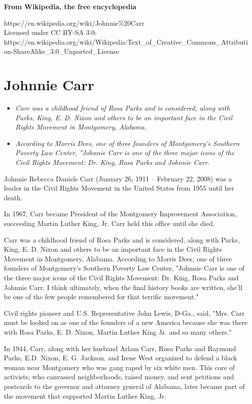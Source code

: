 \textbf{From Wikipedia, the free encyclopedia}

https://en.wikipedia.org/wiki/Johnnie\%20Carr\\
Licensed under CC BY-SA 3.0:\\
https://en.wikipedia.org/wiki/Wikipedia:Text\_of\_Creative\_Commons\_Attribution-ShareAlike\_3.0\_Unported\_License

\section{Johnnie Carr}\label{johnnie-carr}

\begin{itemize}
\item
  \emph{Carr was a childhood friend of Rosa Parks and is considered,
  along with Parks, King, E. D. Nixon and others to be an important face
  in the Civil Rights Movement in Montgomery, Alabama.}
\item
  \emph{According to Morris Dees, one of three founders of Montgomery's
  Southern Poverty Law Center, "Johnnie Carr is one of the three major
  icons of the Civil Rights Movement: Dr. King, Rosa Parks and Johnnie
  Carr.}
\end{itemize}

Johnnie Rebecca Daniels Carr (January 26, 1911 -- February 22, 2008) was
a leader in the Civil Rights Movement in the United States from 1955
until her death.

In 1967, Carr became President of the Montgomery Improvement
Association, succeeding Martin Luther King, Jr. Carr held this office
until she died.

Carr was a childhood friend of Rosa Parks and is considered, along with
Parks, King, E. D. Nixon and others to be an important face in the Civil
Rights Movement in Montgomery, Alabama. According to Morris Dees, one of
three founders of Montgomery's Southern Poverty Law Center, "Johnnie
Carr is one of the three major icons of the Civil Rights Movement: Dr.
King, Rosa Parks and Johnnie Carr. I think ultimately, when the final
history books are written, she'll be one of the few people remembered
for that terrific movement."

Civil rights pioneer and U.S. Representative John Lewis, D-Ga., said,
"Mrs. Carr must be looked on as one of the founders of a new America
because she was there with Rosa Parks, E. D. Nixon, Martin Luther King
Jr. and so many others."

In 1944, Carr, along with her husband Arlam Carr, Rosa Parks and Raymond
Parks, E.D. Nixon, E. G. Jackson, and Irene West organized to defend a
black woman near Montgomery who was gang raped by six white men. This
core of activists, who canvassed neighborhoods, raised money, and sent
petitions and postcards to the governor and attorney general of Alabama,
later became part of the movement that supported Martin Luther King, Jr.

